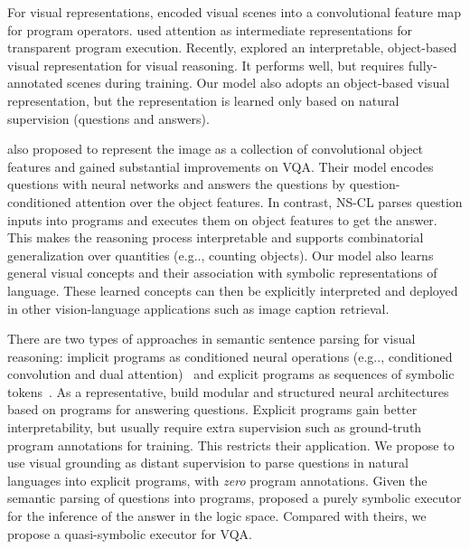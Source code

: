 \documentclass{article} %
\makeatletter
\DeclareRobustCommand\onedot{\futurelet\@let@token\@onedot}
\def\@onedot{\ifx\@let@token.\else.\null\fi\xspace}
\def\eg{e.g\onedot} \def\Eg{E.g\onedot}
\newcommand{\model}{NS-CL\xspace}
\newcommand{\revisioncolor}{}
\makeatother
\begin{document}
For visual representations, \cite{Johnson2017Inferring} encoded visual scenes into a convolutional feature map for program operators. \cite{Mascharka2018Transparency,Hudson2018Compositional} used attention as intermediate representations for transparent program execution. Recently, \cite{kexin} explored an interpretable, object-based visual representation for visual reasoning. It performs well, but requires fully-annotated scenes during training. Our model also adopts an object-based visual representation, but the representation is learned only based on natural supervision (questions and answers).

{\revisioncolor \cite{Anderson2017BottomUp} also proposed to represent the image as a collection of convolutional object features and gained substantial improvements on VQA. Their model encodes questions with neural networks and answers the questions by question-conditioned attention over the object features. In contrast, \model parses question inputs into programs and executes them on object features to get the answer. This makes the reasoning process interpretable and supports combinatorial generalization over quantities (\eg, counting objects). Our model also learns general visual concepts and their association with symbolic representations of language. These learned concepts can then be explicitly interpreted and deployed in other vision-language applications such as image caption retrieval.}
%

There are two types of approaches in semantic sentence parsing for visual reasoning: implicit programs as conditioned neural operations (\eg, conditioned convolution and dual attention)~\citep{Perez2017Film,Hudson2018Compositional} and explicit programs as sequences of symbolic tokens~\citep{Andreas2016Learning,Johnson2017Inferring,Mascharka2018Transparency}. As a representative, \cite{Andreas2016Learning} build modular and structured neural architectures based on programs for answering questions.
%
Explicit programs gain better interpretability, but usually require extra supervision such as ground-truth program annotations for training. This restricts their application. We propose to use visual grounding as distant supervision to parse questions in natural languages into explicit programs, with {\it zero} program annotations. Given the semantic parsing of questions into programs, \cite{kexin} proposed a purely symbolic executor for the inference of the answer in the logic space. Compared with theirs, we propose a quasi-symbolic executor for VQA.
%
%
%
\end{document}
